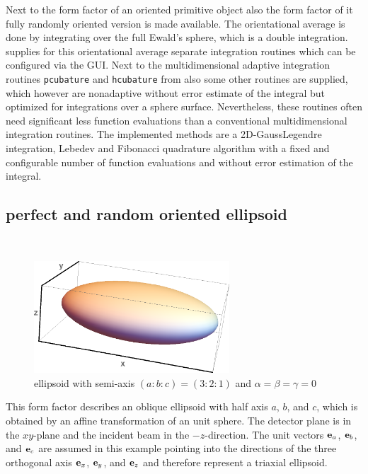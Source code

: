 Next to the form factor of an oriented primitive object also the form factor of it fully randomly oriented version is made available. The orientational average is done by integrating over the full Ewald's sphere, which is a double integration. \SASfit supplies for this orientational average separate integration routines which can be configured via the GUI. Next to the multidimensional adaptive integration routines \texttt{pcubature} and \texttt{hcubature} from \cite{Johnson2017} also some other routines are supplied, which however are nonadaptive without error estimate of the integral but optimized for integrations over a sphere surface. Nevertheless, these routines often need significant less function evaluations than a conventional multidimensional integration routines. The implemented methods are a 2D-GaussLegendre integration, Lebedev \cite{Lebedev1975,Lebedev1976,Lebedev1977} and Fibonacci \cite{Niederreiter1992,Marques_2013} quadrature algorithm with a fixed and configurable number of function evaluations and without error estimation of the integral.

\subsection{perfect and random oriented ellipsoid} ~\\

\begin{figure}[htb]
\begin{center}
\includegraphics[width=0.65\textwidth]{../images/form_factor/supershapes/triaxial_ellipsoid321.png}
\end{center}
\caption{ellipsoid with semi-axis $(a:b:c)=(3:2:1)$ and $\alpha=\beta=\gamma=0$}
\label{fig:opo_ellipsoid}
\end{figure}

This form factor describes an oblique ellipsoid with half axis $a$, $b$, and $c$, which is obtained by an affine transformation of an unit sphere. The detector plane is in the $xy$-plane and the incident beam in the $-z$-direction. The unit vectors $\B{e}_a$, $\B{e}_b$, and $\B{e}_c$ are assumed in this example pointing into the directions of the three orthogonal axis $\B{e}_x$, $\B{e}_y$, and $\B{e}_z$ and therefore represent a triaxial ellipsoid.


